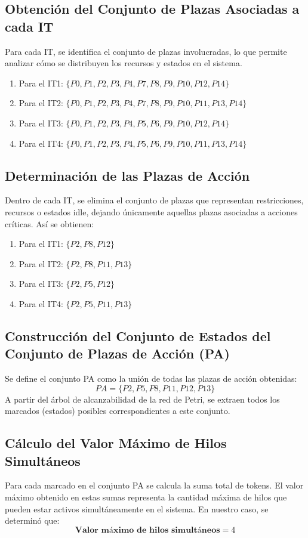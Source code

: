 \documentclass[12pt]{article}
\begin{document}
\subsection{Obtención del Conjunto de Plazas Asociadas a cada IT}
Para cada IT, se identifica el conjunto de plazas involucradas, lo que permite analizar cómo se distribuyen los recursos y estados en el sistema. 
\begin{enumerate}
    \item Para el IT1: $\{P0, P1, P2, P3, P4, P7, P8, P9, P10, P12, P14\}$
    \item Para el IT2: $\{P0, P1, P2, P3, P4, P7, P8, P9, P10, P11, P13, P14\}$
    \item Para el IT3: $\{P0, P1, P2, P3, P4, P5, P6, P9, P10, P12, P14\}$
    \item Para el IT4: $\{P0, P1, P2, P3, P4, P5, P6, P9, P10, P11, P13, P14\}$
\end{enumerate}

\subsection{Determinación de las Plazas de Acción}
Dentro de cada IT, se elimina el conjunto de plazas que representan restricciones, recursos o estados idle, dejando únicamente aquellas plazas asociadas a acciones críticas. Así se obtienen:
\begin{enumerate}
    \item Para el IT1: $\{P2, P8, P12\}$
    \item Para el IT2: $\{P2, P8, P11, P13\}$
    \item Para el IT3: $\{P2, P5, P12\}$
    \item Para el IT4: $\{P2, P5, P11, P13\}$
\end{enumerate}

\subsection{Construcción del Conjunto de Estados del Conjunto de Plazas de Acción (PA)}
Se define el conjunto PA como la unión de todas las plazas de acción obtenidas:
\[
PA = \{P2, P5, P8, P11, P12, P13\}
\]
A partir del árbol de alcanzabilidad de la red de Petri, se extraen todos los marcados (estados) posibles correspondientes a este conjunto.

\subsection{Cálculo del Valor Máximo de Hilos Simultáneos}
Para cada marcado en el conjunto PA se calcula la suma total de tokens. El valor máximo obtenido en estas sumas representa la cantidad máxima de hilos que pueden estar activos simultáneamente en el sistema. En nuestro caso, se determinó que:
\[
\textbf{Valor máximo de hilos simultáneos} = 4
\]
\end{document}
